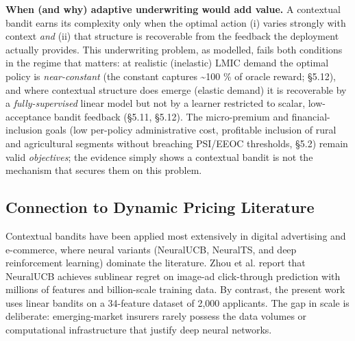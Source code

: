 \textbf{When (and why) adaptive underwriting would add value.} A contextual bandit earns its complexity only when the optimal action (i) varies strongly with context \emph{and} (ii) that structure is recoverable from the feedback the deployment actually provides. This underwriting problem, as modelled, fails both conditions in the regime that matters: at realistic (inelastic) LMIC demand the optimal policy is \emph{near-constant} (the constant captures \textasciitilde100 \% of oracle reward; §5.12), and where contextual structure does emerge (elastic demand) it is recoverable by a \emph{fully-supervised} linear model but not by a learner restricted to scalar, low-acceptance bandit feedback (§5.11, §5.12). The micro-premium and financial-inclusion goals (low per-policy administrative cost, profitable inclusion of rural and agricultural segments without breaching PSI/EEOC thresholds, §5.2) remain valid \emph{objectives}; the evidence simply shows a contextual bandit is not the mechanism that secures them on this problem.

\subsection{Connection to Dynamic Pricing Literature}\label{connection-to-dynamic-pricing-literature}

Contextual bandits have been applied most extensively in digital advertising and e-commerce, where neural variants (NeuralUCB, NeuralTS, and deep reinforcement learning) dominate the literature. Zhou et al. \citeyearpar{Zhou2020} report that NeuralUCB achieves sublinear regret on image-ad click-through prediction with millions of features and billion-scale training data. By contrast, the present work uses linear bandits on a 34-feature dataset of 2,000 applicants. The gap in scale is deliberate: emerging-market insurers rarely possess the data volumes or computational infrastructure that justify deep neural networks.

